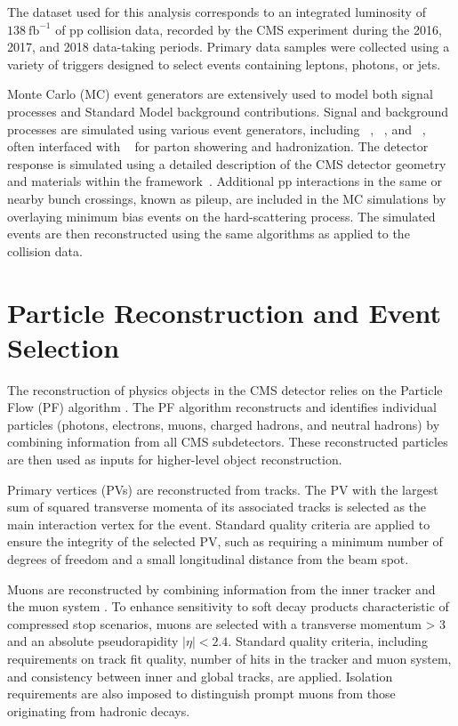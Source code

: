 The dataset used for this analysis corresponds to an integrated luminosity of $138~\mathrm{fb}^{-1}$ of pp collision data, recorded by the CMS experiment during the 2016, 2017, and 2018 data-taking periods. Primary data samples were collected using a variety of triggers designed to select events containing leptons, photons, or jets.

Monte Carlo (MC) event generators are extensively used to model both signal processes and Standard Model background contributions. Signal and background processes are simulated using various event generators, including \MG~\cite{Alwall:2014hca}, \POWHEG~\cite{Nason:2004rx,Frixione:2007vw,Alioli:2010xd}, and \HERWIG~\cite{Bahr:2008pv,Bellm:2015jjp}, often interfaced with \PYTHIA~\cite{Sjostrand:2007gs} for parton showering and hadronization. The detector response is simulated using a detailed description of the CMS detector geometry and materials within the \GEANTfour framework~\cite{Agostinelli:2002hh}. Additional pp interactions in the same or nearby bunch crossings, known as pileup, are included in the MC simulations by overlaying minimum bias events on the hard-scattering process. The simulated events are then reconstructed using the same algorithms as applied to the collision data.

\section{Particle Reconstruction and Event Selection}

The reconstruction of physics objects in the CMS detector relies on the Particle Flow (PF) algorithm \cite{CMS-PAS-PFT-10-001}. The PF algorithm reconstructs and identifies individual particles (photons, electrons, muons, charged hadrons, and neutral hadrons) by combining information from all CMS subdetectors. These reconstructed particles are then used as inputs for higher-level object reconstruction.

Primary vertices (PVs) are reconstructed from tracks. The PV with the largest sum of squared transverse momenta of its associated tracks is selected as the main interaction vertex for the event. Standard quality criteria are applied to ensure the integrity of the selected PV, such as requiring a minimum number of degrees of freedom and a small longitudinal distance from the beam spot.

Muons are reconstructed by combining information from the inner tracker and the muon system \cite{CMS-PAS-MUO-10-004}. To enhance sensitivity to soft decay products characteristic of compressed stop scenarios, muons are selected with a transverse momentum \pt > 3 \GeV and an absolute pseudorapidity $|\eta| < 2.4$. Standard quality criteria, including requirements on track fit quality, number of hits in the tracker and muon system, and consistency between inner and global tracks, are applied. Isolation requirements are also imposed to distinguish prompt muons from those originating from hadronic decays.

